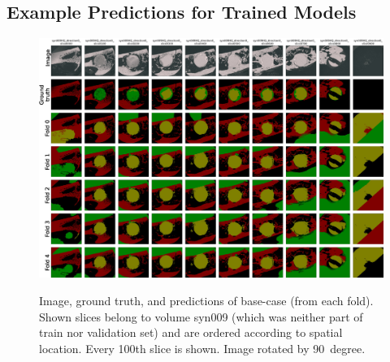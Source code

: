 \clearpage
\subsection{Example Predictions for Trained Models}\label{subsec:example-predictions-for-cropping-regimes}
\begin{figure}[!htb]
    \centering      
    \includegraphics[clip,trim={0 0 0 7}, height=0.98\textwidth, angle=90]{pictures/experiment_2/base-case_final_example_predictions_2_all_folds}\\
    \caption[Predictions with Base Case]{Image, ground truth, and predictions of base-case (from each fold). Shown slices belong to volume syn009 (which was neither part of train nor validation set) and are ordered according to spatial location. Every 100th slice is shown. Image rotated by 90~degree.}
    \label{fig:base-case-predictions-syn009-by-fold}
\end{figure}

